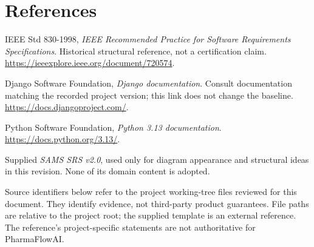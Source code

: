 \documentclass{article}
\newcommand{\Project}{PharmaFlowAI}
\begin{document}
\section{References}\label{sec:references}
\begin{description}[style=nextline,leftmargin=12mm]
\item[R01] IEEE Std 830-1998, \emph{IEEE Recommended Practice for Software Requirements Specifications}. Historical structural reference, not a certification claim. \url{https://ieeexplore.ieee.org/document/720574}.
\item[R02] Django Software Foundation, \emph{Django documentation}. Consult documentation matching the recorded project version; this link does not change the baseline. \url{https://docs.djangoproject.com/}.
\item[R03] Python Software Foundation, \emph{Python 3.13 documentation}. \url{https://docs.python.org/3.13/}.
\item[R04] Supplied \emph{SAMS SRS v2.0}, used only for diagram appearance and structural ideas in this revision. None of its domain content is adopted.
\end{description}
Source identifiers below refer to the project working-tree files reviewed for this document. They identify evidence, not third-party product guarantees. File paths are relative to the project root; the supplied template is an external reference. The reference's project-specific statements are not authoritative for \Project.
\end{document}
